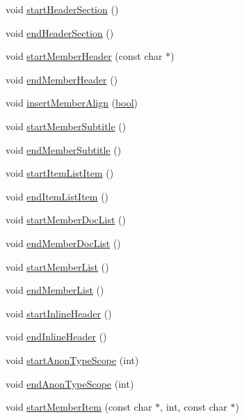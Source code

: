 \begin{DoxyCompactItemize}
void \hyperlink{class_man_generator_a070bbb4b1984e6f82dd4798f1ac325da}{start\+Header\+Section} ()
\item 
void \hyperlink{class_man_generator_aeaaf8704bdcaec06d4fe435491962d50}{end\+Header\+Section} ()
\item 
void \hyperlink{class_man_generator_a9212bdddd633ce485be92c5536c4b145}{start\+Member\+Header} (const char $\ast$)
\item 
void \hyperlink{class_man_generator_ae8b551cb5b57bdafb99421c7d22b96e7}{end\+Member\+Header} ()
\item 
void \hyperlink{class_man_generator_a7304b66d658ba124c84d4553772f27a6}{insert\+Member\+Align} (\hyperlink{qglobal_8h_a1062901a7428fdd9c7f180f5e01ea056}{bool})
\item 
void \hyperlink{class_man_generator_a8401b5bb326a6aeea489f930cdbd6b73}{start\+Member\+Subtitle} ()
\item 
void \hyperlink{class_man_generator_a2338bc0695c2c43e905266bd6178db98}{end\+Member\+Subtitle} ()
\item 
void \hyperlink{class_man_generator_a83d776971ea058ea021d49df05f4e563}{start\+Item\+List\+Item} ()
\item 
void \hyperlink{class_man_generator_a87a722d58e6364660622ab086f20edc8}{end\+Item\+List\+Item} ()
\item 
void \hyperlink{class_man_generator_a94d12a8dc22ce00643f7bec9e0362029}{start\+Member\+Doc\+List} ()
\item 
void \hyperlink{class_man_generator_afc88f71ad193093bf9e390e3c42599de}{end\+Member\+Doc\+List} ()
\item 
void \hyperlink{class_man_generator_a364cef63b278c64d8a3b9b6db37395cb}{start\+Member\+List} ()
\item 
void \hyperlink{class_man_generator_a0ee830ccc307c8123fffe69bd869ee41}{end\+Member\+List} ()
\item 
void \hyperlink{class_man_generator_aa3087d26fc36bd95bebf71f9a92fa404}{start\+Inline\+Header} ()
\item 
void \hyperlink{class_man_generator_aca092428ce78c39b6a3a6e1e8fc66769}{end\+Inline\+Header} ()
\item 
void \hyperlink{class_man_generator_a7650162849d46081499953d5a16b6bbf}{start\+Anon\+Type\+Scope} (int)
\item 
void \hyperlink{class_man_generator_a680b0b24f66dc9038bb9d97dede6c309}{end\+Anon\+Type\+Scope} (int)
\item 
void \hyperlink{class_man_generator_a6a562eabf8ab73b8a9fd0790b441e15c}{start\+Member\+Item} (const char $\ast$, int, const char $\ast$)

\end{DoxyCompactItemize}
